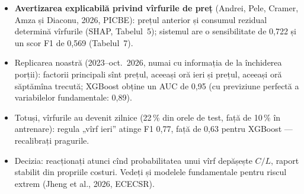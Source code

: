 \begin{itemize}\setlength{\itemsep}{2pt}
  \item \textbf{Avertizarea explicabilă privind vîrfurile de preț} (Andrei, Pele, Cramer, Amza și Diaconu, 2026, PICBE): prețul anterior și consumul rezidual determină vîrfurile (SHAP, Tabelul~5); sistemul are o sensibilitate de 0,722 și un scor F1 de 0,569 (Tabelul~7).
  \item Replicarea noastră (2023--oct.\ 2026, numai cu informația de la închiderea porții): factorii principali sînt prețul, aceeași oră ieri și prețul, aceeași oră săptămîna trecută; XGBoost obține un AUC de 0,95 (cu previziune perfectă a variabilelor fundamentale: 0,89).
  \item Totuși, vîrfurile au devenit zilnice (22\,\% din orele de test, față de 10\,\% în antrenare): regula „vîrf ieri” atinge F1 0,77, față de 0,63 pentru XGBoost --- recalibrați pragurile.
  \item Decizia: reacționați atunci cînd probabilitatea unui vîrf depășește $C/L$, raport stabilit din propriile costuri. Vedeți și modelele fundamentale pentru riscul extrem (Jheng et al., 2026, ECECSR).
\end{itemize}
